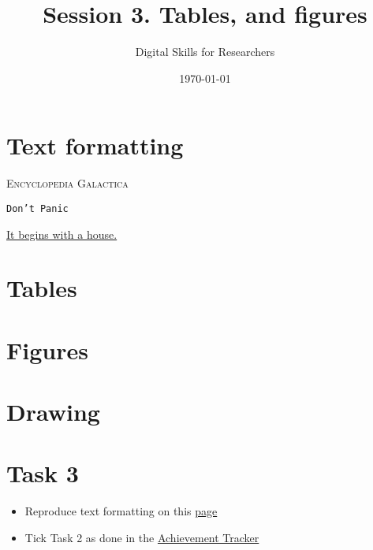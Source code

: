 \documentclass[a4paper,11pt]{article}
\title{Session 3. Tables, and figures}
\author{Digital Skills for Researchers}
\date{\today}
\begin{document}
\maketitle
\tableofcontents

\section{Text formatting}

\textsc{Encyclopedia Galactica}


\texttt{Don't Panic} 


\underline{It begins with a house.}


\section{Tables}

\section{Figures}

\section{Drawing}

\section*{Task 3}
\label{task}

\begin{tcolorbox}[width=\textwidth, colback={yellow!40!white}, title={}, colbacktitle=yellow!60!white, coltitle=black]
	\begin{itemize}
		\item Reproduce text formatting on this \href{https://github.com/kunilovskaya/dskills_workshop/blob/main/w1_latex_basics/s2/practice2.pdf}{page}
		\item Tick Task 2 as done in the \href{https://docs.google.com/document/d/17ZBAQGBKIlO6JMwxz3LlghYq1sdsUjhHVXga46BK0kg/edit?usp=sharing}{Achievement Tracker}
	\end{itemize}
	
\end{tcolorbox}%
\end{document}
